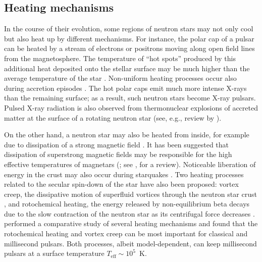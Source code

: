 \documentclass[smallextended]{svjour3}       %
\newcommand{\Teff}{T_\mathrm{eff}}
\begin{document}
\subsection{Heating mechanisms}
\label{sect:heating}

In the course of their evolution,
some regions of neutron stars may not only cool but also heat up by 
different mechanisms. For instance,
the polar cap of a pulsar can be heated by a stream of
electrons or positrons moving along open field lines from
the magnetosphere. The temperature of ``hot spots'' produced
by this additional heat deposited onto the stellar surface may be much higher
than the average temperature of the star \citep[e.g.,][]{GreensteinHartke}.
Non-uniform heating processes occur also during accretion episodes
\cite[e.g.,][]{InogamovSunyaev10}. The hot polar caps emit
much more intense X-rays than the remaining surface; as a
result, such neutron stars become X-ray pulsars. Pulsed
X-ray radiation is also observed from thermonuclear
explosions of accreted matter at the surface of a rotating
neutron star (see, e.g., review by
\citealp{StrohmayerBildsten06}).

On the other hand, a neutron star may also be heated from
inside, for example due to dissipation of a strong magnetic
field \citep[e.g.,][]{MUK98,UrpinKonenkov08,PonsMG09}. It has been
suggested that dissipation of superstrong magnetic fields
may be responsible for the high effective temperatures of
magnetars (\citealp{Thompson01}; see 
\citealp{Mereghetti-ea15}, for a review). Noticeable liberation of
energy in the crust may also occur during starquakes
\citep{HaenselDP90,Franco-ea00,Perna11}. 
Two heating processes related to the  secular spin-down of the star have 
also been proposed: vortex creep, the dissipative motion of superfluid vortices 
through the neutron star crust
\citep{Alpar-ea84}, and rotochemical heating, the energy
released by non-equilibrium beta decays due to the slow
contraction of the neutron star as its centrifugal force
decreases \citep{Reisenegger95}. 
\citet{GonzalezReisenegger10} performed a comparative study
of several heating mechanisms and found that the
rotochemical heating and vortex creep can be most important
for classical and millisecond pulsars. Both processes,
albeit model-dependent, can keep millisecond pulsars at a
surface temperature $\Teff\sim10^5$~K.
\end{document}
